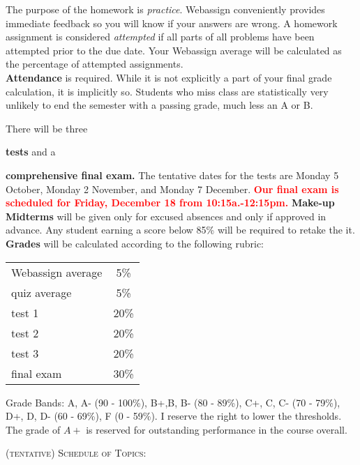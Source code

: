 \documentclass[11pt]{article}
\begin{document}
The purpose of the homework is \emph{practice}. Webassign conveniently provides immediate feedback so you will know if your answers are wrong. A homework assignment is considered \emph{attempted} if all parts of all problems have been attempted prior to the due date. Your Webassign average will be calculated as the percentage of attempted assignments.\\

\textbf{Attendance} is required. While it is not explicitly a part of your final grade calculation, it is implicitly so. Students who miss class are statistically very unlikely to end the semester with a passing grade, much less an A or B.

There will be three {\textbf{tests} and a {\textbf{comprehensive final exam.} The tentative dates for the tests are Monday 5 October, Monday 2 November, and Monday 7 December. \textcolor{red}{\textbf{Our final exam is scheduled for Friday, December 18 from 10:15a.-12:15pm.}} \textbf{Make-up Midterms} will be given only for excused absences and only if approved in advance. Any student earning a score below 85\% will be required to retake the it.\\

\textbf{Grades} will be calculated according to the following rubric:
\begin{tabular}{|l|c|}
  \hline
  Webassign average & 5\%\\
  quiz average & 5\% \\
  test 1 & 20\% \\
  test 2 & 20\%\\
  test 3 & 20\%\\
  final exam & 30\% \\
  \hline
\end{tabular}

Grade Bands: A, A- (90 - 100\%), B+,B, B- (80 - 89\%), C+, C, C- (70 - 79\%), D+, D, D-
(60 - 69\%), F (0 - 59\%).  I reserve the right to lower the thresholds. The grade of $A+$ is reserved for outstanding performance in the course overall.

\newpage

\textsc{(tentative) Schedule of Topics:}

}}
\end{document}
